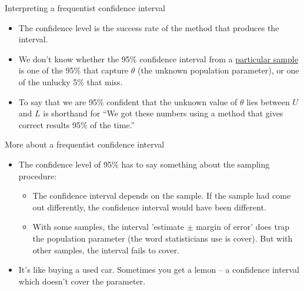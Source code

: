 \documentclass[10pt]{beamer}\usepackage[]{graphicx}\usepackage[]{color}
\begin{document}
\begin{frame}{Interpreting a frequentist confidence interval}
	\begin{itemize}
		\setlength\itemsep{1em}
		\item The confidence level is the success rate of the method that produces the interval. \pause
		\item We don't know whether the 95\% confidence interval from a \underline{particular
			sample} is one of the 95\% that capture $\theta$ (the unknown population parameter), or one of the unlucky 5\% that miss. \pause
		\item To say that we are 95\% confident that the unknown value of $\theta$
		lies between $U$ and $L$ is shorthand for ``We got these numbers using a
		method that gives correct results 95\% of the time.''
	\end{itemize}
\end{frame}



\begin{frame}{More about a frequentist confidence interval}
	
	\begin{itemize}
		\item The confidence level of 95\% has to say something about the sampling procedure: \pause
		
		\begin{itemize}
			\item The confidence interval depends on the sample. If the sample had come out differently, the confidence interval would have been different. \pause
			\item With some samples, the interval 'estimate $\pm$ margin of error' does trap the population parameter (the word statisticians use is cover). But with other samples, the interval fails to cover.
		\end{itemize}
		\pause
		\item It's like buying a used car. Sometimes you get a lemon – a confidence interval which doesn't cover the parameter.
		
	\end{itemize}
\end{frame}
\end{document}
